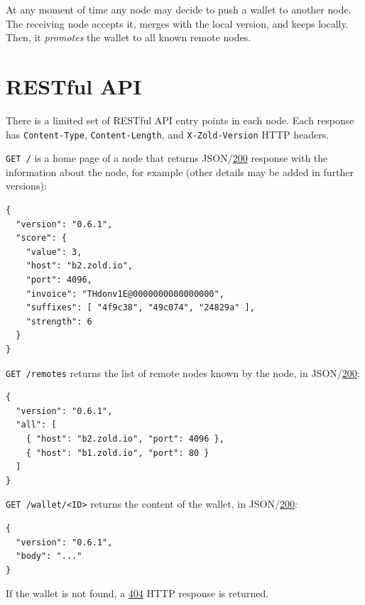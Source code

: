 \documentclass[11pt,oneside]{article}
\newcommand\dd[1]{\colorbox{gray!30}{\texttt{#1}}}
\begin{document}
At any moment of time any node may decide to push a wallet to another node.
The receiving node accepts it, merges with the local version, and keeps locally.
Then, it \emph{promotes} the wallet to all known remote nodes.

\section{RESTful API}

There is a limited set of RESTful API entry points in each node.
Each response has \dd{Content-Type},
\dd{Content-Length}, and \dd{X-Zold-Version}
HTTP headers.

\dd{GET /} is a home page of a node that returns
JSON/\href{https://www.w3.org/Protocols/rfc2616/rfc2616-sec10.html#sec10.2.1}{200}
response with the
information about the node, for example (other details may be added in
further versions):

\begin{verbatim}
{
  "version": "0.6.1",
  "score": {
    "value": 3,
    "host": "b2.zold.io",
    "port": 4096,
    "invoice": "THdonv1E@0000000000000000",
    "suffixes": [ "4f9c38", "49c074", "24829a" ],
    "strength": 6
  }
}
\end{verbatim}

\dd{GET /remotes} returns the list of remote nodes known by the node,
in JSON/\href{https://www.w3.org/Protocols/rfc2616/rfc2616-sec10.html#sec10.2.1}{200}:

\begin{verbatim}
{
  "version": "0.6.1",
  "all": [
    { "host": "b2.zold.io", "port": 4096 },
    { "host": "b1.zold.io", "port": 80 }
  ]
}\end{verbatim}

\dd{GET /wallet/<ID>} returns the content of the wallet, in
JSON/\href{https://www.w3.org/Protocols/rfc2616/rfc2616-sec10.html#sec10.2.1}{200}:

\begin{verbatim}
{
  "version": "0.6.1",
  "body": "..."
}\end{verbatim}

If the wallet is not found, a
\href{https://www.w3.org/Protocols/rfc2616/rfc2616-sec10.html#sec10.4.5}{404}
HTTP response is returned.
\end{document}
